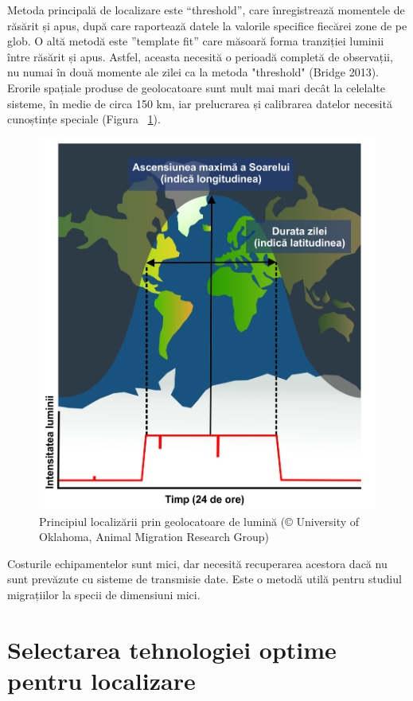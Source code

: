 \documentclass[11pt,onehalfspacing]{elife}
\begin{document}
Metoda principală de localizare este “threshold”, care înregistrează momentele de răsărit și apus, după care raportează datele la valorile specifice fiecărei zone de pe glob. O altă metodă este ”template fit” care măsoară forma tranziției luminii între răsărit și apus. Astfel, aceasta necesită o perioadă completă de observații, nu numai în două momente ale zilei ca la metoda "threshold" (Bridge 2013). Erorile spațiale produse de geolocatoare sunt mult mai mari decât la celelalte sisteme, în medie de circa 150 km, iar prelucrarea și calibrarea datelor necesită cunoștințe speciale \citep{Silvy2012} (Figura ~\ref{fig6}).
\begin{figure}[ht]
\includegraphics[width=12cm]{Fig6.jpg}
\caption{Principiul localizării prin geolocatoare de lumină (© University of Oklahoma, Animal Migration Research Group)} \label{fig6}
\end{figure}

Costurile echipamentelor sunt mici, dar necesită recuperarea acestora dacă nu sunt prevăzute cu sisteme de transmisie date. Este o metodă utilă pentru studiul migrațiilor la specii de dimensiuni mici.

\section{Selectarea tehnologiei optime pentru localizare} 
\end{document}
